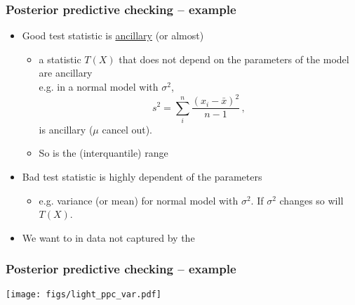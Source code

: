 \documentclass[10pt]{beamer}
\begin{document}
\begin{frame}[fragile]

\frametitle{Posterior predictive checking -- example}

  \begin{itemize}
  \item<1-> Good test statistic is \href{https://en.wikipedia.org/wiki/Ancillary_statistic}{ancillary} (or almost)
    \begin{itemize}
    \item a statistic $T(X)$ that does not depend on the parameters of the model are ancillary\\e.g. in a normal model with  $\sigma^2$,
    \[
    s^2 = \sum_i^n \frac{(x_i-\bar{x})^2}{n-1}\,,
    \]
    is ancillary ($\mu$ cancel out).
    \item So is the (interquantile) range
    \end{itemize}
  \item<2-> Bad test statistic is highly dependent of the parameters
    \begin{itemize}
    \item e.g. variance (or mean) for normal model with  $\sigma^2$. If $\sigma^2$ changes so will $T(X)$.
    \end{itemize}
  \item<3-> We want to  in data not captured by the 
  \end{itemize}

\end{frame}

\begin{frame}[fragile]

\frametitle{Posterior predictive checking -- example}

  \texttt{[image: figs/light\_ppc\_var.pdf]}

\end{frame}
\end{document}
